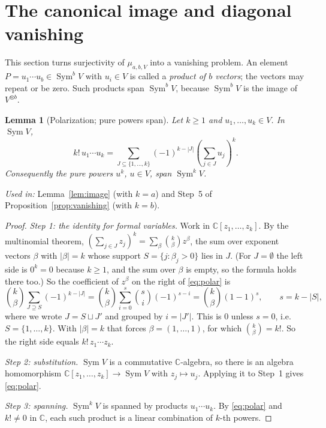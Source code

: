 \documentclass[11pt]{article}
\newtheorem{lemma}[theorem]{Lemma}
\theoremstyle{remark}
\DeclareMathOperator{\Sym}{Sym}
\newcommand{\C}{\mathbb C}
\begin{document}
\section{The canonical image and diagonal vanishing}\label{sec:map}

This section turns surjectivity of $\mu_{a,b,V}$ into a vanishing problem.
An element $P=u_1\cdots u_b\in\Sym^bV$ with $u_i\in V$ is called a
\emph{product of $b$ vectors}; the vectors may repeat or be zero. Such
products span $\Sym^bV$, because $\Sym^bV$ is the image of $V^{\otimes b}$.

\begin{lemma}[Polarization; pure powers span]\label{lem:powers}
Let $k\ge1$ and $u_1,\dots,u_k\in V$. In $\Sym V$,
\begin{equation}\label{eq:polar}
 k!\,u_1\cdots u_k
 =\sum_{J\subseteq\{1,\ldots,k\}}(-1)^{k-|J|}
   \left(\sum_{j\in J}u_j\right)^k .
\end{equation}
Consequently the pure powers $u^k$, $u\in V$, span $\Sym^kV$.
\end{lemma}

\noindent\emph{Used in:} Lemma~\ref{lem:image} (with $k=a$) and Step~5 of
Proposition~\ref{prop:vanishing} (with $k=b$).

\begin{proof}
\emph{Step 1: the identity for formal variables.} Work in
$\C[z_1,\dots,z_k]$. By the multinomial theorem,
$(\sum_{j\in J}z_j)^k=\sum_\beta\binom{k}{\beta}z^\beta$, the sum over
exponent vectors $\beta$ with $|\beta|=k$ whose support
$S=\{j:\beta_j>0\}$ lies in $J$. (For $J=\emptyset$ the left side is
$0^k=0$ because $k\ge1$, and the sum over $\beta$ is empty, so the formula
holds there too.) So the coefficient of $z^\beta$ on the right of
\eqref{eq:polar} is
\[
 \binom{k}{\beta}\sum_{J\supseteq S}(-1)^{k-|J|}
 =\binom{k}{\beta}\sum_{i=0}^{s}\binom{s}{i}(-1)^{s-i}
 =\binom{k}{\beta}(1-1)^{s},\qquad s=k-|S|,
\]
where we wrote $J=S\sqcup J'$ and grouped by $i=|J'|$. This is $0$ unless
$s=0$, i.e.\ $S=\{1,\dots,k\}$. With $|\beta|=k$ that forces
$\beta=(1,\dots,1)$, for which $\binom{k}{\beta}=k!$. So the right side
equals $k!\,z_1\cdots z_k$.

\emph{Step 2: substitution.} $\Sym V$ is a commutative $\C$-algebra, so
there is an algebra homomorphism $\C[z_1,\dots,z_k]\to\Sym V$ with
$z_j\mapsto u_j$. Applying it to Step~1 gives \eqref{eq:polar}.

\emph{Step 3: spanning.} $\Sym^kV$ is spanned by products $u_1\cdots u_k$.
By \eqref{eq:polar} and $k!\ne0$ in $\C$, each such product is a linear
combination of $k$-th powers.
\end{proof}
\end{document}

